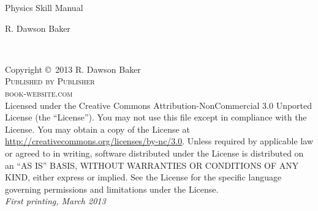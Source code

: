 \documentclass[11pt]{book} %
\begin{document}

\begingroup
\thispagestyle{empty}
\centering
\vspace*{9cm}
\par\normalfont\fontsize{35}{35}\sffamily\selectfont
Physics Skill Manual \par %
\vspace*{1cm}
{\Huge R. Dawson Baker}\par %
\endgroup


\newpage
~\vfill
\thispagestyle{empty}

\noindent Copyright \copyright\ 2013 R. Dawson Baker\\ %

\noindent \textsc{Published by Publisher}\\ %

\noindent \textsc{book-website.com}\\ %

\noindent Licensed under the Creative Commons Attribution-NonCommercial 3.0 Unported License (the ``License''). You may not use this file except in compliance with the License. You may obtain a copy of the License at \url{http://creativecommons.org/licenses/by-nc/3.0}. Unless required by applicable law or agreed to in writing, software distributed under the License is distributed on an \textsc{``AS IS'' BASIS, WITHOUT WARRANTIES OR CONDITIONS OF ANY KIND}, either express or implied. See the License for the specific language governing permissions and limitations under the License.\\ %

\noindent \textit{First printing, March 2013} %


\end{document}

